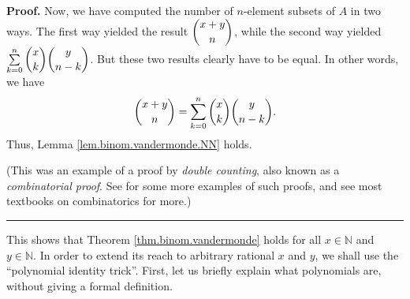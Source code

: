 \documentclass[numbers=enddot,12pt,final,onecolumn,notitlepage]{scrartcl}%
\numberwithin{exer}{subsection}
\theoremstyle{definition}
\newenvironment{proof}[1][Proof]{\noindent\textbf{#1.} }{\ \rule{0.5em}{0.5em}}
\let\sumnonlimits\sum
\renewcommand{\sum}{\sumnonlimits\limits}
\begin{document}
\begin{proof}
Now, we have computed the number of $n$-element subsets of $A$ in two ways.
The first way yielded the result $\dbinom{x+y}{n}$, while the second way
yielded $\sum_{k=0}^{n}\dbinom{x}{k}\dbinom{y}{n-k}$. But these two results
clearly have to be equal. In other words, we have%
\[
\dbinom{x+y}{n}=\sum_{k=0}^{n}\dbinom{x}{k}\dbinom{y}{n-k}.
\]
Thus, Lemma \ref{lem.binom.vandermonde.NN} holds.

(This was an example of a proof by \textit{double counting}, also known as a
\textit{combinatorial proof}. See \cite[\S 15.10]{LeLeMe} for some more
examples of such proofs, and see most textbooks on combinatorics for more.)
\end{proof}

This shows that Theorem \ref{thm.binom.vandermonde} holds for all
$x\in\mathbb{N}$ and $y\in\mathbb{N}$. In order to extend its reach to
arbitrary rational $x$ and $y$, we shall use the \textquotedblleft polynomial
identity trick\textquotedblright. First, let us briefly explain what
polynomials are, without giving a formal definition.
\end{document}

